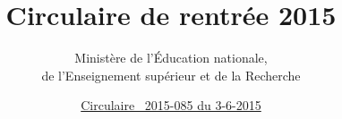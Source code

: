 \documentclass{article}
\title{Circulaire de rentrée 2015}
\author{Ministère de l'Éducation nationale,\\ de l'Enseignement supérieur et de la Recherche}
\date{\href{http://www.education.gouv.fr/pid25535/bulletin_officiel.html?cid_bo=89301}{Circulaire \no{}~2015-085 du 3-6-2015}}
\begin{document}
\maketitle
\renewcommand{\contentsname}{Sommaire}
\tableofcontents

\end{document}
